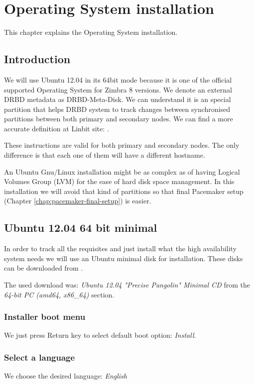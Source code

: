 

\chapter{Operating System installation}
\label{chap:operating-system-installation}
This chapter explains the Operating System installation.

\section {Introduction}
We will use Ubuntu 12.04 in its 64bit mode because it is one of the official supported Operating System for Zimbra 8 versions. We denote an external DRBD metadata as DRBD-Meta-Disk. We can understand it is an special partition that helps DRBD system to track changes between synchronised partitions between both primary and secondary nodes. We can find a more accurate definition at Linbit site: \cite{LinbitDRBDInternals}.

These instructions are valid for both primary and secondary nodes. The only difference is that each one of them will have a different hostname.

An Ubuntu Gnu/Linux installation might be as complex as of having Logical Volumes Group (LVM) for the ease of hard disk space management. In this installation we will avoid that kind of partitions so that final Pacemaker setup (Chapter \ref{chap:pacemaker-final-setup}) is easier.

\section {Ubuntu 12.04 64 bit minimal}
In order to track all the requisites and just install what the high availability system needs we will use an Ubuntu minimal disk for installation. These disks can be downloaded from \cite{UbuntuMinimalDisk}.

The used download was: \textit{Ubuntu 12.04 "Precise Pangolin" Minimal CD} from the \textit{64-bit PC (amd64, x86\_64)} section. 

\subsection {Installer boot menu}
We just press Return key to select default boot option: \textit{Install}.
\subsection {Select a language}
We choose the desired language: \textit{English}
